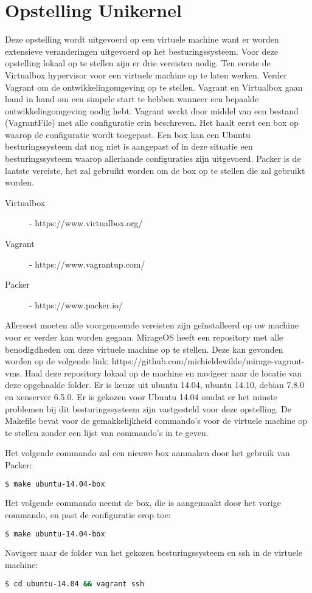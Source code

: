 \section{Opstelling Unikernel}

Deze opstelling wordt uitgevoerd op een virtuele machine want er worden extensieve veranderingen uitgevoerd op het besturingssysteem. Voor deze opstelling lokaal op te stellen zijn er drie vereisten nodig. Ten eerste de Virtualbox hypervisor voor een virtuele machine op te laten werken. Verder Vagrant om de ontwikkelingomgeving op te stellen. Vagrant en Virtualbox gaan hand in hand om een simpele start te hebben wanneer een bepaalde ontwikkelingomgeving nodig hebt. Vagrant werkt door middel van een bestand (VagrantFile) met alle configuratie erin beschreven. Het haalt eerst een box op waarop de configuratie wordt toegepast. Een box kan een Ubuntu besturingssysteem dat nog niet is aangepast of in deze situatie een besturingssysteem waarop allerhande configuraties zijn uitgevoerd. Packer is de laatste vereiste, het zal gebruikt worden om de box op te stellen die zal gebruikt worden. 

\begin{description}
\item [Virtualbox] - https://www.virtualbox.org/
\item [Vagrant] - https://www.vagrantup.com/
\item [Packer] - https://www.packer.io/ 
\end{description}

Allereest moeten alle voorgenoemde vereisten zijn geïnstalleerd op uw machine voor er verder kan worden gegaan. MirageOS heeft een repository met alle benodigdheden om deze virtuele machine op te stellen. Deze kan gevonden worden op de volgende link: https://github.com/michieldewilde/mirage-vagrant-vms. Haal deze repository lokaal op de machine en navigeer naar de locatie van deze opgehaalde folder. Er is keuze uit ubuntu 14.04, ubuntu 14.10, debian 7.8.0 en xenserver 6.5.0. Er is gekozen voor Ubuntu 14.04 omdat er het minste problemen bij dit besturingssysteem zijn vastgesteld voor deze opstelling. De Makefile bevat voor de gemakkelijkheid commando's voor de virtuele machine op te stellen zonder een lijst van commando's in te geven.

\noindent Het volgende commando zal een nieuwe box aanmaken door het gebruik van Packer:
\begin{lstlisting}[language=bash]
  $ make ubuntu-14.04-box
\end{lstlisting}

\noindent Het volgende commando neemt de box, die is aangemaakt door het vorige commando, en past de configuratie erop toe:
\begin{lstlisting}[language=bash]
  $ make ubuntu-14.04-box
\end{lstlisting}

\noindent Navigeer naar de folder van het gekozen besturingssysteem en ssh in de virtuele machine: 
\begin{lstlisting}[language=bash]
  $ cd ubuntu-14.04 && vagrant ssh
\end{lstlisting}


